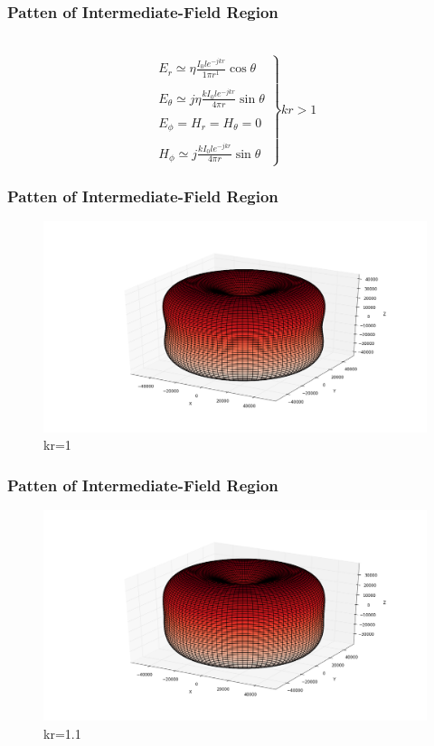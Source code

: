 \documentclass[compress=true]{beamer}
\begin{document}
\begin{frame}
  \frametitle{Patten of Intermediate-Field Region}
  \begin{block}{~}
  \begin{equation}
    \left.
      \begin{array}{l}
        E_r \simeq {\eta}\frac{I_0le^{-jkr}}{1\pi r^1}\cos{\theta}\\\\
        E_{\theta} \simeq j{\eta}\frac{kI_0le^{-jkr}}{4\pi r}\sin{\theta}\\\\
        E_{\phi}=H_r=H_{\theta}=0\\\\
        H_{\phi}\simeq j\frac{kI_0le^{-jkr}}{4\pi r}\sin{\theta}
      \end{array}
    \right\} kr>1 
  \end{equation}
\end{block}
\end{frame}
\begin{frame}
  \frametitle{Patten of Intermediate-Field Region}
  \begin{figure}
    \includegraphics[height=0.7\textheight]{inter_kr_1_1.png}
    \caption*{\tiny{kr=1}}
  \end{figure}
\end{frame}
\begin{frame}
  \frametitle{Patten of Intermediate-Field Region}
  \begin{figure}
    \includegraphics[height=0.7\textheight]{inter_kr_1_1_1.png}
    \caption*{\tiny{kr=1.1}}
  \end{figure}
\end{frame}
\end{document}
